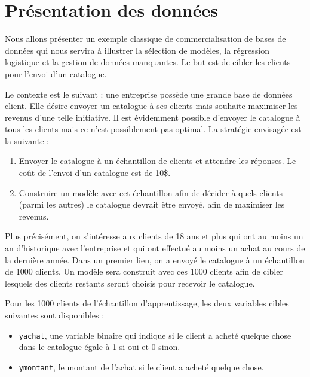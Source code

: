 \documentclass[
  11pt,
  letterpaper,
]{scrbook}
\providecommand{\tightlist}{%
  \setlength{\itemsep}{0pt}\setlength{\parskip}{0pt}}\usepackage{longtable,booktabs,array}
\theoremstyle{definition}
\theoremstyle{remark}
\begin{document}
\hypertarget{pruxe9sentation-des-donnuxe9es-1}{%
\section{Présentation des
données}\label{pruxe9sentation-des-donnuxe9es-1}}

Nous allons présenter un exemple classique de commercialisation de bases
de données qui nous servira à illustrer la sélection de modèles, la
régression logistique et la gestion de données manquantes. Le but est de
cibler les clients pour l'envoi d'un catalogue.

Le contexte est le suivant : une entreprise possède une grande base de
données client. Elle désire envoyer un catalogue à ses clients mais
souhaite maximiser les revenus d'une telle initiative. Il est évidemment
possible d'envoyer le catalogue à tous les clients mais ce n'est
possiblement pas optimal. La stratégie envisagée est la suivante :

\begin{enumerate}
\def\labelenumi{\arabic{enumi}.}
\tightlist
\item
  Envoyer le catalogue à un échantillon de clients et attendre les
  réponses. Le coût de l'envoi d'un catalogue est de 10\$.
\item
  Construire un modèle avec cet échantillon afin de décider à quels
  clients (parmi les autres) le catalogue devrait être envoyé, afin de
  maximiser les revenus.
\end{enumerate}

Plus précisément, on s'intéresse aux clients de 18 ans et plus qui ont
au moins un an d'historique avec l'entreprise et qui ont effectué au
moins un achat au cours de la dernière année. Dans un premier lieu, on a
envoyé le catalogue à un échantillon de 1000 clients. Un modèle sera
construit avec ces 1000 clients afin de cibler lesquels des clients
restants seront choisis pour recevoir le catalogue.

Pour les 1000 clients de l'échantillon d'apprentissage, les deux
variables cibles suivantes sont disponibles :

\begin{itemize}
\tightlist
\item
  \texttt{yachat}, une variable binaire qui indique si le client a
  acheté quelque chose dans le catalogue égale à 1 si oui et 0 sinon.
\item
  \texttt{ymontant}, le montant de l'achat si le client a acheté quelque
  chose.
\end{itemize}
\end{document}
